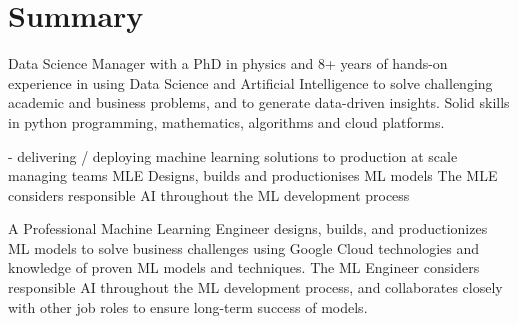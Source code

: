 \documentclass[11pt,a4paper,sans]{moderncv}        %
\begin{document}
\makecvtitle

\vspace{-2em}

\section{Summary}
Data Science Manager with a PhD in physics and 8+ years of hands-on experience in using Data Science and Artificial Intelligence to solve challenging academic and business problems, and to generate data-driven insights. Solid skills in python programming, mathematics, algorithms and cloud platforms. 

- delivering / deploying machine learning solutions to production
at scale
managing teams 
MLE Designs, builds and productionises ML models
The MLE considers responsible AI throughout the ML development process


A Professional Machine Learning Engineer designs, builds, and productionizes ML models to solve business challenges using Google Cloud technologies and knowledge of proven ML models and techniques. The ML Engineer considers responsible AI throughout the ML development process, and collaborates closely with other job roles to ensure long-term success of models.
\end{document}
